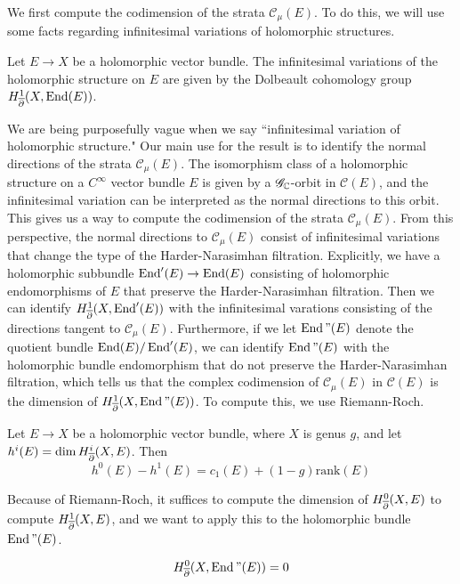 We first compute the codimension of the strata $\mathscr{C}_\mu(E)$. To do
this, we will use some facts regarding infinitesimal variations of holomorphic
structures.
%
\begin{prop}
Let $E \to X$ be a holomorphic vector bundle. The infinitesimal variations
of the holomorphic structure on $E$ are given by the Dolbeault cohomology group
$H^1_{\overline{\partial}}(X, \operatorname{End}(E))$.
\end{prop}
%
We are being purposefully vague when we say ``infinitesimal variation of holomorphic
structure." Our main use for the result is to identify the normal directions
of the strata $\mathscr{C}_\mu(E)$. The isomorphism class of a holomorphic
structure on a $C^\infty$ vector bundle $E$ is given by a $\mathscr{G}_{\mathbb{C}}$-orbit
in $\mathscr{C}(E)$, and the infinitesimal variation can be interpreted as the
normal directions to this orbit. This gives us a way to compute the
codimension of the strata $\mathscr{C}_\mu(E)$. From this perspective,
the normal directions to $\mathscr{C}_\mu(E)$ consist of infinitesimal variations
that change the type of the Harder-Narasimhan filtration. Explicitly,
we have a holomorphic subbundle $\operatorname{End}'(E) \to \operatorname{End}(E)$ consisting of
holomorphic endomorphisms of $E$ that preserve the Harder-Narasimhan filtration.
Then we can identify $H^1_{\overline{\partial}}(X,\operatorname{End}'(E))$ with the infinitesimal varations
consisting of the directions tangent to $\mathscr{C}_\mu(E)$. Furthermore, if
we let $\operatorname{End}"(E)$ denote the quotient bundle $\operatorname{End}(E)/\operatorname{End}'(E)$,
we can identify $\operatorname{End}"(E)$ with the holomorphic bundle endomorphism that do
not preserve the Harder-Narasimhan filtration, which tells us that the complex
codimension of $\mathscr{C}_\mu(E)$ in $\mathscr{C}(E)$ is the dimension of
$H^1_{\overline{\partial}}(X,\operatorname{End}"(E))$. To compute this, we use Riemann-Roch.
%
\begin{thm}
Let $E \to X$ be a holomorphic vector bundle, where $X$ is genus $g$, and let
$h^i(E) = \dim H^i_{\overline{\partial}}(X,E)$. Then
\[
h^0(E) - h^1(E) = c_1(E) + (1-g)\mathrm{rank}(E)
\]
\end{thm}
%
Because of Riemann-Roch, it suffices to compute the dimension of
$H^0_{\overline{\partial}}(X,E)$ to compute $H^1_{\overline{\partial}}(X,E)$, and we want to apply
this to the holomorphic bundle $\operatorname{End}"(E)$.
%
\begin{prop}
\[
H^0_{\overline{\partial}}(X,\operatorname{End}"(E)) = 0
\]
\end{prop}
%
